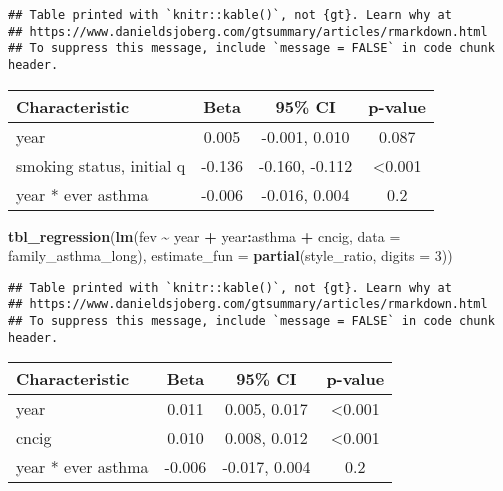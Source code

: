 \documentclass[
]{article}
\newenvironment{Shaded}{\begin{snugshade}}{\end{snugshade}}
\newcommand{\AttributeTok}[1]{\textcolor[rgb]{0.13,0.29,0.53}{#1}}
\newcommand{\DecValTok}[1]{\textcolor[rgb]{0.00,0.00,0.81}{#1}}
\newcommand{\FunctionTok}[1]{\textcolor[rgb]{0.13,0.29,0.53}{\textbf{#1}}}
\newcommand{\NormalTok}[1]{#1}
\newcommand{\SpecialCharTok}[1]{\textcolor[rgb]{0.81,0.36,0.00}{\textbf{#1}}}
\begin{document}
\begin{verbatim}
## Table printed with `knitr::kable()`, not {gt}. Learn why at
## https://www.danieldsjoberg.com/gtsummary/articles/rmarkdown.html
## To suppress this message, include `message = FALSE` in code chunk header.
\end{verbatim}

\begin{longtable}[]{@{}lccc@{}}
\toprule\noalign{}
\textbf{Characteristic} & \textbf{Beta} & \textbf{95\% CI} &
\textbf{p-value} \\
\midrule\noalign{}
\endhead
\bottomrule\noalign{}
\endlastfoot
year & 0.005 & -0.001, 0.010 & 0.087 \\
smoking status, initial q & -0.136 & -0.160, -0.112 & \textless0.001 \\
year * ever asthma & -0.006 & -0.016, 0.004 & 0.2 \\
\end{longtable}

\begin{Shaded}
\begin{Highlighting}[]
\FunctionTok{tbl\_regression}\NormalTok{(}\FunctionTok{lm}\NormalTok{(fev }\SpecialCharTok{\textasciitilde{}}\NormalTok{ year }\SpecialCharTok{+}\NormalTok{ year}\SpecialCharTok{:}\NormalTok{asthma }\SpecialCharTok{+}\NormalTok{ cncig,}
                  \AttributeTok{data =}\NormalTok{ family\_asthma\_long),}
               \AttributeTok{estimate\_fun =} \FunctionTok{partial}\NormalTok{(style\_ratio, }\AttributeTok{digits =} \DecValTok{3}\NormalTok{))}
\end{Highlighting}
\end{Shaded}

\begin{verbatim}
## Table printed with `knitr::kable()`, not {gt}. Learn why at
## https://www.danieldsjoberg.com/gtsummary/articles/rmarkdown.html
## To suppress this message, include `message = FALSE` in code chunk header.
\end{verbatim}

\begin{longtable}[]{@{}lccc@{}}
\toprule\noalign{}
\textbf{Characteristic} & \textbf{Beta} & \textbf{95\% CI} &
\textbf{p-value} \\
\midrule\noalign{}
\endhead
\bottomrule\noalign{}
\endlastfoot
year & 0.011 & 0.005, 0.017 & \textless0.001 \\
cncig & 0.010 & 0.008, 0.012 & \textless0.001 \\
year * ever asthma & -0.006 & -0.017, 0.004 & 0.2 \\
\end{longtable}
\end{document}

